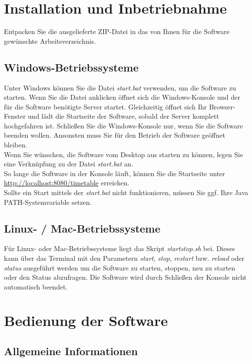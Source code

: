 \documentclass[fontsize=12pt]{scrartcl}
\begin{document}
\section{Installation und Inbetriebnahme}

Entpacken Sie die ausgelieferte ZIP-Datei in das von Ihnen für die Software gewünschte Arbeitsverzeichnis. 

\subsection{Windows-Betriebssysteme}
Unter Windows können Sie die Datei \textit{start.bat} verwenden, um die Software zu starten. Wenn Sie die Datei anklicken öffnet sich die Windows-Konsole und der für die Software benötigte Server startet. Gleichzeitig öffnet sich Ihr Browser-Fenster und lädt die Startseite der Software, sobald der Server komplett hochgefahren ist. Schließen Sie die Windows-Konsole nur, wenn Sie die Software beenden wollen. Ansonsten muss Sie für den Betrieb der Software geöffnet bleiben.\\
Wenn Sie wünschen, die Software vom Desktop aus starten zu können, legen Sie eine Verknüpfung zu der Datei \textit{start.bat} an.\\
So lange die Software in der Konsole läuft, können Sie die Startseite unter \url{http://localhost:8080/timetable} erreichen.\\

Sollte ein Start mittels der \textit{start.bat} nicht funktionieren, müssen Sie ggf. Ihre Java PATH-Systemvariable setzen.

\subsection{Linux- / Mac-Betriebssysteme}
Für Linux- oder Mac-Betriebssysteme liegt das Skript \textit{startstop.sh} bei. Dieses kann über das Terminal mit den Parametern \textit{start}, \textit{stop}, \textit{restart} bzw. \textit{reload} oder \textit{status} ausgeführt werden um die Software zu starten, stoppen, neu zu starten oder den Status abzufragen. Die Software wird durch Schließen der Konsole nicht automatisch beendet.

\section{Bedienung der Software}

\subsection{Allgemeine Informationen}
\end{document}
